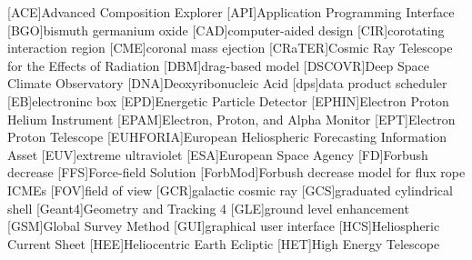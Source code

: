 	\begin{acronym}\itemsep0pt
	[ACE]{Advanced Composition Explorer}
	[API]{Application Programming Interface}
	[BGO]{bismuth germanium oxide}
	[CAD]{computer-aided design}
	[CIR]{corotating interaction region}
	[CME]{coronal mass ejection}
	[CRaTER]{Cosmic Ray Telescope for the Effects of Radiation}
	[DBM]{drag-based model}
	[DSCOVR]{Deep Space Climate Observatory}
	[DNA]{Deoxyribonucleic Acid}
	[dps]{data product scheduler}
	[EB]{electroninc box}
	[EPD]{Energetic Particle Detector}
	[EPHIN]{Electron Proton Helium Instrument}
	[EPAM]{Electron, Proton, and Alpha Monitor}
	[EPT]{Electron Proton Telescope}
    [EUHFORIA]{European Heliospheric Forecasting Information Asset}
	[EUV]{extreme ultraviolet}
	[ESA]{European Space Agency}
	[FD]{Forbush decrease}
	[FFS]{Force-field Solution}
	[ForbMod]{Forbush decrease model for flux rope \acsp{ICME}}
	[FOV]{field of view}
	[GCR]{galactic cosmic ray}
	[GCS]{graduated cylindrical shell}
	[Geant4]{Geometry and Tracking 4}
	[GLE]{ground level enhancement}
	[GSM]{Global Survey Method}
	[GUI]{graphical user interface}
	[HCS]{Heliospheric Current Sheet}
	[HEE]{Heliocentric Earth Ecliptic}
	[HET]{High Energy Telescope}

\end{acronym}

